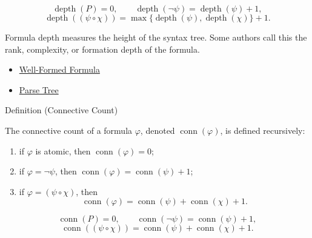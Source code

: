 \begin{remark*}
\[
\operatorname{depth}(P)=0,\qquad
\operatorname{depth}(\neg\psi)=\operatorname{depth}(\psi)+1,
\]
\[
\operatorname{depth}((\psi\circ\chi))
=
\max\{\operatorname{depth}(\psi),\operatorname{depth}(\chi)\}+1.
\]
\end{remark*}

\begin{remark*}[Interpretation]
Formula depth measures the height of the syntax tree. Some authors call this the rank, complexity, or formation depth of the formula.
\end{remark*}

\begin{dependencies}
\begin{itemize}
  \item \hyperref[def:well-formed-formula]{Well-Formed Formula}
  \item \hyperref[def:parse-tree-propositional-logic]{Parse Tree}
\end{itemize}
\end{dependencies}
\begin{definitionbox}{Definition (Connective Count)}
\begin{definition}
\label{def:connective-count-propositional-logic}
The connective count of a formula \(\varphi\), denoted \(\operatorname{conn}(\varphi)\), is defined recursively:
\begin{enumerate}
\item if \(\varphi\) is atomic, then \(\operatorname{conn}(\varphi)=0\);
\item if \(\varphi=\neg\psi\), then \(\operatorname{conn}(\varphi)=\operatorname{conn}(\psi)+1\);
\item if \(\varphi=(\psi\circ\chi)\), then
\[
\operatorname{conn}(\varphi)=\operatorname{conn}(\psi)+\operatorname{conn}(\chi)+1.
\]
\end{enumerate}
\end{definition}
\end{definitionbox}

\begin{remark*}
\[
\operatorname{conn}(P)=0,\qquad
\operatorname{conn}(\neg\psi)=\operatorname{conn}(\psi)+1,
\]
\[
\operatorname{conn}((\psi\circ\chi))
=
\operatorname{conn}(\psi)+\operatorname{conn}(\chi)+1.
\]
\end{remark*}


